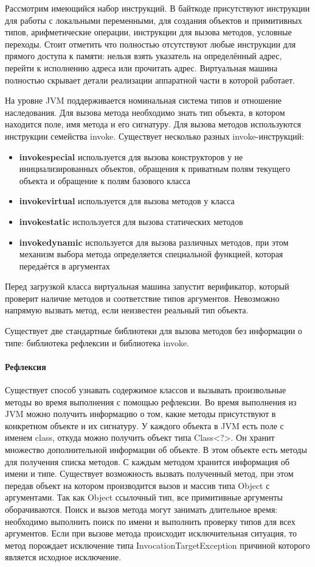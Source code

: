 Рассмотрим имеющийся набор инструкций. В байткоде присутствуют инструкции для работы с локальными переменными, для создания объектов и примитивных типов, арифметические операции, инструкции для вызова методов, условные переходы. Стоит отметить что полностью отсутствуют любые инструкции для прямого доступа к памяти: нельзя взять указатель на определённый адрес, перейти к исполнению адреса или прочитать адрес. Виртуальная машина полностью скрывает детали реализации аппаратной части в которой работает.

На уровне JVM поддерживается номинальная система типов и отношение наследования. Для вызова метода необходимо знать тип объекта, в котором находится поле, имя метода и его сигнатуру. Для вызова методов используются инструкции семейства invoke. Существует несколько разных invoke-инструкций:
\begin{itemize}
    \item \textbf{invokespecial} используется для вызова конструкторов у не инициализированных объектов, обращения к приватным полям текущего объекта и обращение к полям базового класса
    \item \textbf{invokevirtual} используется для вызова методов у класса
    \item \textbf{invokestatic} используется для вызова статических методов
    \item \textbf{invokedynamic} используется для вызова различных методов, при этом механизм выбора метода определяется специальной функцией, которая передаётся в аргументах
\end{itemize}
Перед загрузкой класса виртуальная машина запустит верификатор, который проверит наличие методов и соответствие типов аргументов. Невозможно напрямую вызвать метод, если неизвестен реальный тип объекта.

Существует две стандартные библиотеки для вызова методов без информации о типе: библиотека рефлексии и библиотека invoke.
\paragraph{Рефлексия}
Существует способ узнавать содержимое классов и вызывать произвольные методы во время выполнения с помощью рефлексии\cite{jvm:reflection}. Во время выполнения из JVM можно получить информацию о том, какие методы присутствуют в конкретном объекте и их сигнатуру. У каждого объекта в JVM есть поле с именем class, откуда можно получить объект типа Class<?>. Он хранит множество дополнительной информации об объекте. В этом объекте есть методы для получения списка методов. С каждым методом хранится информация об имени и типе. Существует возможность вызвать полученный метод, при этом передав объект на котором производится вызов и массив типа Object с аргументами. Так как Object ссылочный тип, все примитивные аргументы оборачиваются. Поиск и вызов метода могут занимать длительное время: необходимо выполнить поиск по имени и выполнить проверку типов для всех аргументов. Если при вызове метода происходит исключительная ситуация, то метод порождает исключение типа InvocationTargetException причиной которого является исходное исключение.

